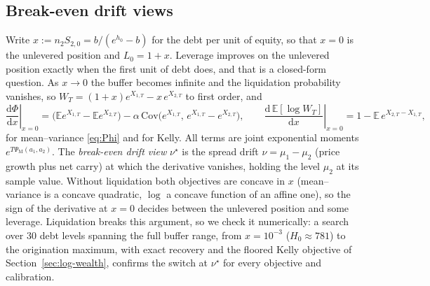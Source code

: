 \documentclass[11pt]{article}
\newcommand{\E}{\mathbb{E}}
\newcommand{\diff}{\mathrm{d}}
\theoremstyle{plain}
\theoremstyle{definition}
\theoremstyle{remark}
\begin{document}
\subsection{Break-even drift views}
Write $x:=n_2S_{2,0}=b/(e^{h_0}-b)$ for the debt per unit of equity, so that $x=0$ is the unlevered
position and $L_0=1+x$. Leverage improves on the unlevered position exactly when the first unit of
debt does, and that is a closed-form question. As $x\to0$ the buffer becomes infinite and the
liquidation probability vanishes, so $W_T=(1+x)e^{X_{1,T}}-x\,e^{X_{2,T}}$ to first order, and
\begin{equation}\label{eq:breakeven}
\left.\frac{\diff\Phi}{\diff x}\right|_{x=0}
=\bigl(\E e^{X_{1,T}}-\E e^{X_{2,T}}\bigr)-\alpha\,\mathrm{Cov}\bigl(e^{X_{1,T}},\,e^{X_{1,T}}-e^{X_{2,T}}\bigr),
\qquad
\left.\frac{\diff\,\E[\log W_T]}{\diff x}\right|_{x=0}=1-\E\,e^{X_{2,T}-X_{1,T}},
\end{equation}
for mean--variance \eqref{eq:Phi} and for Kelly. All terms are joint exponential moments
$e^{T\Psi_{\mathrm M}(a_1,a_2)}$. The \emph{break-even drift view} $\nu^\star$ is the spread drift
$\nu=\mu_1-\mu_2$ (price growth plus net carry) at which the derivative vanishes, holding the level
$\mu_2$ at its sample value. Without liquidation both objectives are concave in $x$ (mean--variance
is a concave quadratic, $\log$ a concave function of an affine one), so the sign of the derivative at
$x=0$ decides between the unlevered position and some leverage. Liquidation breaks this argument, so
we check it numerically: a search over $30$ debt levels spanning the full buffer range, from
$x=10^{-3}$ ($H_0\approx781$) to the origination maximum, with exact recovery and the floored Kelly
objective of Section~\ref{sec:log-wealth}, confirms the switch at $\nu^\star$ for every objective
and calibration.
\end{document}
